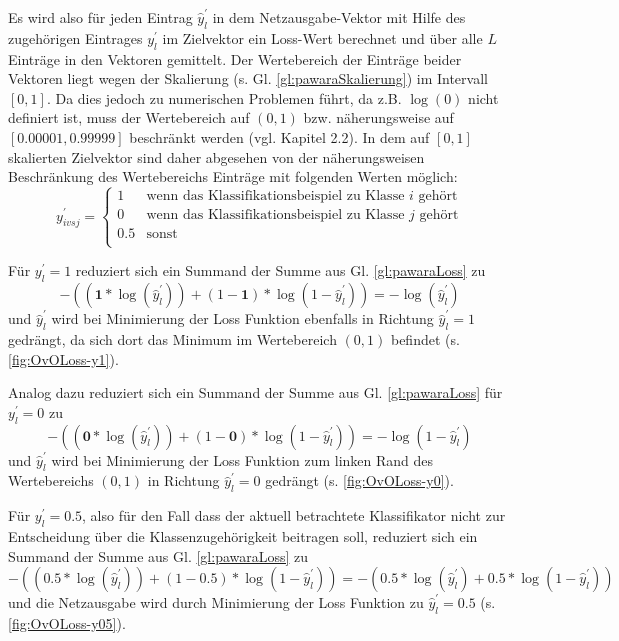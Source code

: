 Es wird also für jeden Eintrag $\widehat{y}_{l}^{'}$ in dem Netzausgabe-Vektor mit Hilfe des zugehörigen Eintrages $y_{l}^{'}$ im Zielvektor ein Loss-Wert berechnet und über alle $L$ Einträge in den Vektoren gemittelt. Der Wertebereich der Einträge beider Vektoren liegt wegen der Skalierung (s. Gl. \ref{gl:pawaraSkalierung}) im Intervall $[0,1]$. Da dies jedoch zu numerischen Problemen führt, da z.B. $\log{(0)}$ nicht definiert ist, muss der Wertebereich auf $(0, 1)$ bzw. näherungsweise auf $[0.00001, 0.99999]$ beschränkt werden (vgl. \cite{pawaraPaper} Kapitel 2.2).
In dem auf $[0, 1]$ skalierten Zielvektor sind daher abgesehen von der näherungsweisen Beschränkung des Wertebereichs Einträge mit folgenden Werten möglich:
\[
y_{ivsj}^{'}=
\begin{cases}
1 & \text{wenn das Klassifikationsbeispiel zu Klasse } i \text{ gehört}\\
0 & \text{wenn das Klassifikationsbeispiel zu Klasse } j \text{ gehört}\\
0.5 & \text{sonst}\\
\end{cases}
\]

Für $y_{l}^{'} = 1$ reduziert sich ein Summand der Summe aus Gl. \ref{gl:pawaraLoss} zu
\[-((\boldsymbol{1} * \log{(\widehat{y}_{l}^{'})}) + (1 - \boldsymbol{1}) * \log{(1-\widehat{y}_{l}^{'})}) = -\log{(\widehat{y}_{l}^{'})}\]
und $\widehat{y}_{l}^{'}$ wird bei Minimierung der Loss Funktion ebenfalls in Richtung $\widehat{y}_{l}^{'}=1$ gedrängt, da sich dort das Minimum im Wertebereich $(0, 1)$ befindet (s. \ref{fig:OvOLoss-y1}).

Analog dazu reduziert sich ein Summand der Summe aus Gl. \ref{gl:pawaraLoss} für $y_{l}^{'} = 0$ zu
\[-((\boldsymbol{0} * \log{(\widehat{y}_{l}^{'})}) + (1 - \boldsymbol{0}) * \log{(1-\widehat{y}_{l}^{'})}) = -\log{(1-\widehat{y}_{l}^{'})}\]
und $\widehat{y}_{l}^{'}$ wird bei Minimierung der Loss Funktion zum linken Rand des Wertebereichs $(0, 1)$ in Richtung $\widehat{y}_{l}^{'}=0$  gedrängt (s. \ref{fig:OvOLoss-y0}).

Für $y_{l}^{'} = 0.5$, also für den Fall dass der aktuell betrachtete Klassifikator nicht zur Entscheidung über die Klassenzugehörigkeit beitragen soll, reduziert sich ein Summand der Summe aus Gl. \ref{gl:pawaraLoss} zu
\[-((\boldsymbol{0.5} * \log{(\widehat{y}_{l}^{'})}) + (1 - \boldsymbol{0.5}) * \log{(1-\widehat{y}_{l}^{'})}) = - (0.5 * \log{(\widehat{y}_{l}^{'})} + 0.5 * \log{(1-\widehat{y}_{l}^{'})})\]
und die Netzausgabe wird durch Minimierung der Loss Funktion zu $\widehat{y}_{l}^{'}=0.5$ (s. \ref{fig:OvOLoss-y05}).

